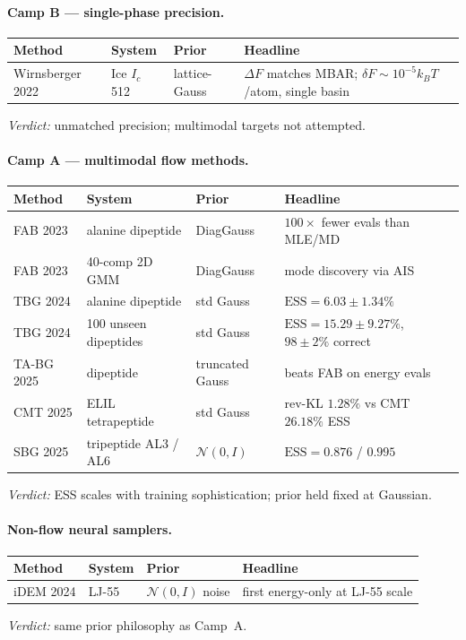 \documentclass[11pt,letterpaper]{article}
\newcommand{\ESS}{\mathrm{ESS}}
\theoremstyle{plain}
\begin{document}
\paragraph{Camp B --- single-phase precision.}
\begin{center}\small
\begin{tabular}{@{}lp{2.6cm}lp{4.2cm}@{}}\toprule
Method & System & Prior & Headline \\\midrule
Wirnsberger 2022 & Ice $I_c$ 512 & lattice-Gauss & $\Delta F$ matches MBAR; $\delta F\!\sim\!10^{-5}k_BT$/atom, single basin\\
\bottomrule\end{tabular}
\end{center}
\emph{Verdict:} unmatched precision; multimodal targets not attempted.

\paragraph{Camp A --- multimodal flow methods.}
\begin{center}\small
\begin{tabular}{@{}lp{2.6cm}lp{4.2cm}@{}}\toprule
Method & System & Prior & Headline \\\midrule
FAB 2023 & alanine dipeptide & DiagGauss & $100\times$ fewer evals than MLE/MD\\
FAB 2023 & 40-comp 2D GMM & DiagGauss & mode discovery via AIS\\
TBG 2024 & alanine dipeptide & std Gauss & $\ESS=6.03\pm 1.34\%$\\
TBG 2024 & 100 unseen dipeptides & std Gauss & $\ESS=15.29\pm 9.27\%$, $98\pm 2\%$ correct\\
TA-BG 2025 & dipeptide & truncated Gauss & beats FAB on energy evals\\
CMT 2025 & ELIL tetrapeptide & std Gauss & rev-KL $1.28\%$ vs CMT $26.18\%$ ESS\\
SBG 2025 & tripeptide AL3 / AL6 & $\mathcal N(0,I)$ & $\ESS=0.876$ / $0.995$\\
\bottomrule\end{tabular}
\end{center}
\emph{Verdict:} ESS scales with training sophistication; prior held fixed at Gaussian.

\paragraph{Non-flow neural samplers.}
\begin{center}\small
\begin{tabular}{@{}lp{2.6cm}lp{4.2cm}@{}}\toprule
Method & System & Prior & Headline \\\midrule
iDEM 2024 & LJ-55 & $\mathcal N(0,I)$ noise & first energy-only at LJ-55 scale\\
\bottomrule\end{tabular}
\end{center}
\emph{Verdict:} same prior philosophy as Camp~A.
\end{document}
